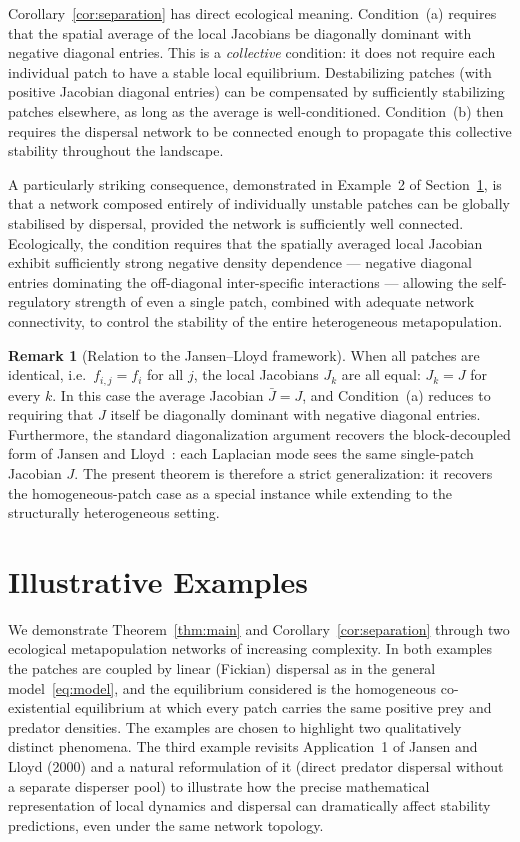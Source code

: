 \documentclass[12pt,a4paper]{article}
\theoremstyle{definition}
\newtheorem{remark}[theorem]{Remark}
\begin{document}
Corollary~\ref{cor:separation} has direct ecological meaning.
Condition~(a) requires that the spatial average of the local Jacobians
be diagonally dominant with negative diagonal entries.
This is a \emph{collective} condition: it does not require each
individual patch to have a stable local equilibrium.
Destabilizing patches (with positive Jacobian diagonal entries) can
be compensated by sufficiently stabilizing patches elsewhere, as long
as the average is well-conditioned.
Condition~(b) then requires the dispersal network to be connected
enough to propagate this collective stability throughout the landscape.

A particularly striking consequence, demonstrated in Example~2 of Section~\ref{sec:examples}, is that a network composed entirely of individually unstable patches can be globally stabilised by dispersal, provided the network is sufficiently well connected. Ecologically, the condition requires that the spatially averaged local Jacobian exhibit sufficiently strong negative density dependence — negative diagonal entries dominating the off-diagonal inter-specific interactions — allowing the self-regulatory strength of even a single patch, combined with adequate network connectivity, to control the stability of the entire heterogeneous metapopulation.

\begin{remark}[Relation to the Jansen--Lloyd framework]
\label{rem:jansen}
When all patches are identical, i.e.\ $f_{i,j} = f_i$ for all $j$,
the local Jacobians $J_k$ are all equal: $J_k = J$ for every $k$.
In this case the average Jacobian $\bar{J} = J$, and
Condition~(a) reduces to requiring that $J$ itself be diagonally
dominant with negative diagonal entries.
Furthermore, the standard diagonalization argument recovers the
block-decoupled form of Jansen and Lloyd~\cite{jansen2000}: each
Laplacian mode sees the same single-patch Jacobian $J$.
The present theorem is therefore a strict generalization: it recovers
the homogeneous-patch case as a special instance while extending to
the structurally heterogeneous setting.
\end{remark}

\section{Illustrative Examples}
\label{sec:examples}
We demonstrate Theorem~\ref{thm:main} and Corollary~\ref{cor:separation}
through two ecological metapopulation networks of increasing complexity.
In both examples the patches are coupled by linear (Fickian) dispersal
as in the general model~\eqref{eq:model}, and the equilibrium
considered is the homogeneous co-existential equilibrium at which every
patch carries the same positive prey and predator densities.
The examples are chosen to highlight two qualitatively distinct
phenomena. The third example revisits Application~1 of Jansen and Lloyd (2000) and a natural reformulation of it (direct predator dispersal without a separate disperser pool) to illustrate how the precise mathematical representation of local dynamics and dispersal can dramatically affect stability predictions, even under the same network topology.
\end{document}
